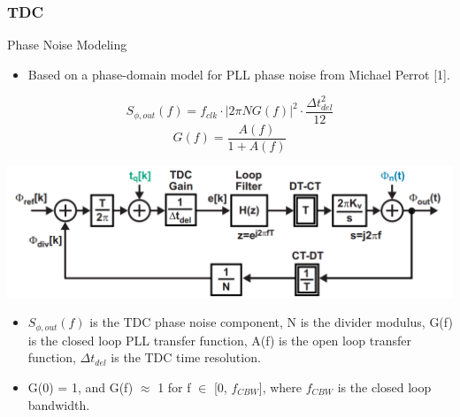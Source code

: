 \documentclass[t, screen, aspectratio=43]{beamer}
\begin{document}
\begin{frame}
	\frametitle{TDC}
	\begin{block}{Phase Noise Modeling}
 		\begin{itemize}
			\scriptsize
			\item Based on a phase-domain model for PLL phase noise from Michael Perrot [1].

		\end{itemize}  

		\begin{minipage}{5cm}
			\tiny
			\begin{equation}
				S_{\phi,out}(f)= f_{clk}\cdot\left| 2\pi NG(f) \right|^2\cdot\frac{\Delta t_{del}^2}{12}
			\end{equation}
			\begin{equation}
				G(f)= \frac{A(f)}{1 + A(f)}
			\end{equation}
		\end{minipage}
		\begin{minipage}{6cm}
			\center\includegraphics[width=1\textwidth, angle=0]{pll_loop.png}
		\end{minipage}
 		\begin{itemize}
			\scriptsize
			\item $S_{\phi,out}(f)$ is the TDC phase noise component, N is the divider modulus, G(f) is the closed loop PLL transfer function, A(f) is the open loop transfer function, $\Delta t_{del}$ is the TDC time resolution.
			\item G(0) = 1, and G(f) $\approx$ 1 for f $\in$ [0, $f_{CBW}$], where $f_{CBW}$ is the closed loop bandwidth.

		\end{itemize}  
	\end{block}
\end{frame}
\end{document}
